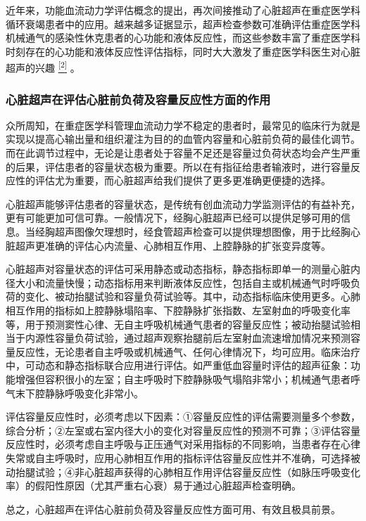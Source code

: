 近年来，功能血流动力学评估概念的提出，再次间接推动了心脏超声在重症医学科循环衰竭患者中的应用。越来越多证据显示，超声检查参数可准确评估重症医学科机械通气的感染性休克患者的心功能和液体反应性，而这些参数丰富了重症医学科时刻存在的心功能和液体反应性评估指标，同时大大激发了重症医学科医生对心脏超声的兴趣
\protect\hyperlink{text00009.htmlux5cux23ch2-8}{\textsuperscript{{[}2{]}}}
。

\subsubsection{心脏超声在评估心脏前负荷及容量反应性方面的作用}

众所周知，在重症医学科管理血流动力学不稳定的患者时，最常见的临床行为就是实现以提高心输出量和组织灌注为目的的血管内容量和心脏前负荷的最佳化调节。而在此调节过程中，无论是让患者处于容量不足还是容量过负荷状态均会产生严重的后果，评估患者的容量状态极为重要。所以在有指征给患者输液时，进行容量反应性的评估尤为重要，而心脏超声给我们提供了更多更准确更便捷的选择。

心脏超声能够评估患者的容量状态，是传统有创血流动力学监测评估的有益补充，更有可能更加可信可靠。一般情况下，经胸心脏超声已经可以提供足够可用的信息。当经胸超声图像欠理想时，经食管超声检查可以提供理想图像，用于比经胸心脏超声更准确的评估心内流量、心肺相互作用、上腔静脉的扩张变异度等。

心脏超声对容量状态的评估可采用静态或动态指标，静态指标即单一的测量心脏内径大小和流量快慢；动态指标用来判断液体反应性，包括自主或机械通气时呼吸负荷的变化、被动抬腿试验和容量负荷试验等。其中，动态指标临床使用更多。心肺相互作用的指标如上腔静脉塌陷率、下腔静脉扩张指数、左室射血的呼吸变化率等，用于预测窦性心律、无自主呼吸机械通气患者的容量反应性；被动抬腿试验相当于内源性容量负荷试验，通过超声观察抬腿前后左室射血流速增加情况来预测容量反应性，无论患者自主呼吸或机械通气、任何心律情况下，均可应用。临床治疗中，可动态和静态指标联合应用进行评估。如严重低血容量时评估的超声征象：功能增强但容积很小的左室；自主呼吸时下腔静脉吸气塌陷非常小；机械通气患者呼气末下腔静脉呼吸变化非常小。

评估容量反应性时，必须考虑以下因素：①容量反应性的评估需要测量多个参数，综合分析；②左室或右室内径大小的变化对容量反应性的预测不可靠；③评估容量反应性时，必须考虑自主呼吸与正压通气对采用指标的不同影响，当患者存在心律失常或自主呼吸时，应用心肺相互作用的指标评估容量反应性并不准确，可选择被动抬腿试验；④非心脏超声获得的心肺相互作用评估容量反应性（如脉压呼吸变化率）的假阳性原因（尤其严重右心衰）易于通过心脏超声检查明确。

总之，心脏超声在评估心脏前负荷及容量反应性方面可用、有效且极具前景。

